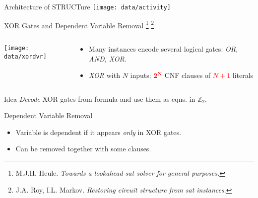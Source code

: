 \documentclass[mathserif,serif]{beamer}
\begin{document}
\begin{frame}{Architecture of STRUCTure}
  \centering
  \texttt{[image: data/activity]}
\end{frame}

\begin{frame}{XOR Gates and Dependent Variable Removal
\footnote{M.J.H. Heule. \emph{Towards a lookahead sat solver for general purposes.}}
\footnote{J.A. Roy, I.L. Markov. \emph{Restoring circuit structure from sat instances}.}}

  \begin{columns}[t]
    \begin{column}[T]{0.3\textwidth}
      \texttt{[image: data/xordvr]}
    \end{column}

    \begin{column}[T]{0.8\textwidth}
      \begin{itemize}
        \item Many instances encode several logical gates: \emph{OR, AND, XOR}.
        \item \emph{XOR} with $N$ inputs: \textcolor{red}{$\mathbf{2^{N}}$} CNF
        clauses of \textcolor{red}{$N + 1$} literals
      \end{itemize}
    \end{column}
  \end{columns}

  \begin{block}{Idea}
    \emph{Decode} XOR gates from formula and use them as eqns. in $\mathbb{Z}_2$.
  \end{block}

  \begin{block}{Dependent Variable Removal}
    \begin{itemize}
      \item Variable is dependent if it appears \emph{only} in XOR gates.
      \item Can be removed together with some clauses.
    \end{itemize}
  \end{block}
\end{frame}
\end{document}
